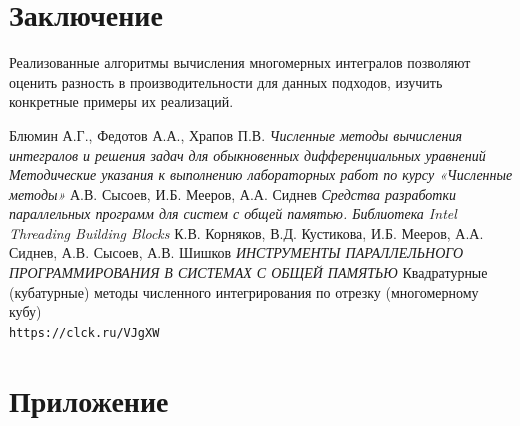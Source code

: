 \documentclass{report}
\begin{document}
\section*{Заключение}
Реализованные алгоритмы вычисления многомерных интегралов позволяют оценить разность в производительности
для данных подходов, изучить конкретные примеры их реализаций.
\newpage
\begin{thebibliography}{1}
Блюмин А.Г., Федотов А.А., Храпов П.В.
\textit{Численные методы вычисления интегралов и решения задач для обыкновенных дифференциальных уравнений Методические указания
к выполнению лабораторных работ по курсу «Численные методы»}
А.В. Сысоев, И.Б. Мееров, А.А. Сиднев
\textit{Средства разработки параллельных программ для систем
с общей памятью. Библиотека Intel Threading Building 
Blocks}
К.В. Корняков, В.Д. Кустикова, И.Б. Мееров, А.А. Сиднев, А.В. Сысоев, А.В. Шишков
\textit{ИНСТРУМЕНТЫ ПАРАЛЛЕЛЬНОГО ПРОГРАММИРОВАНИЯ В СИСТЕМАХ С ОБЩЕЙ ПАМЯТЬЮ}
Квадратурные (кубатурные) методы численного интегрирования по отрезку (многомерному кубу)
\\\texttt{https://clck.ru/VJgXW}
\end{thebibliography}
\newpage
\section*{Приложение}
\end{document}
